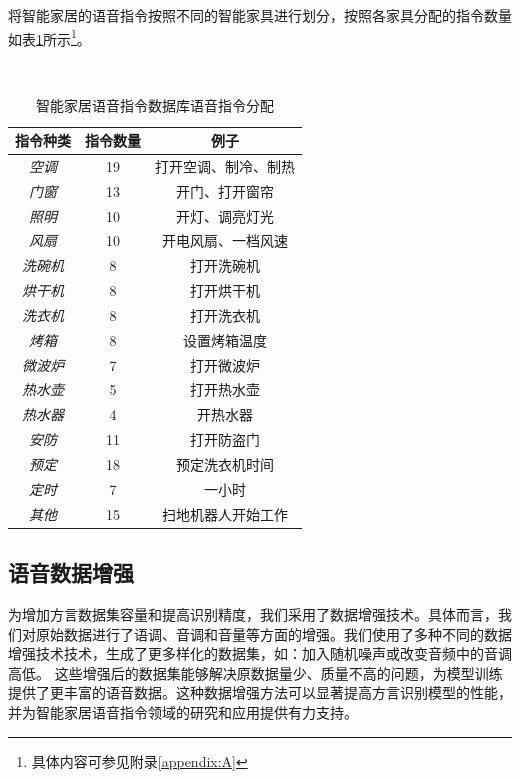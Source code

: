 \documentclass[lang=cn,cite=super]{elegantpaper}
\begin{document}
将智能家居的语音指令按照不同的智能家具进行划分，按照各家具分配的指令数量如表\ref{tab:1}所示\footnote{具体内容可参见附录\ref{appendix:A}}。
\begin{table}[h]
    \caption{\label{tab:1} 智能家居语音指令数据库语音指令分配}\
    \begin{center}
        \begin{tabular}{ccc}
            \toprule
            \textbf{指令种类} & \textbf{指令数量} & \textbf{例子} \\
            \midrule
            \textit{空调} & 19 & 打开空调、制冷、制热 \\
            \textit{门窗} & 13 & 开门、打开窗帘 \\
            \textit{照明} & 10 & 开灯、调亮灯光 \\
            \textit{风扇} & 10 & 开电风扇、一档风速 \\
            \textit{洗碗机} & 8 & 打开洗碗机 \\
            \textit{烘干机} & 8 & 打开烘干机 \\
            \textit{洗衣机} & 8 & 打开洗衣机 \\
            \textit{烤箱} & 8 & 设置烤箱温度 \\
            \textit{微波炉} & 7 & 打开微波炉\\
            \textit{热水壶} & 5 & 打开热水壶 \\
            \textit{热水器} & 4 & 开热水器 \\
            \textit{安防} & 11 & 打开防盗门 \\
            \textit{预定} & 18 & 预定洗衣机时间\\
            \textit{定时} & 7 & 一小时 \\
            \textit{其他} & 15 & 扫地机器人开始工作 \\
            \bottomrule
        \end{tabular}
    \end{center}
\end{table}


\subsection{语音数据增强}
为增加方言数据集容量和提高识别精度，我们采用了数据增强技术。具体而言，我们对原始数据进行了语调、音调和音量等方面的增强。我们使用了多种不同的数据增强技术技术，生成了更多样化的数据集，如：加入随机噪声或改变音频中的音调高低。
这些增强后的数据集能够解决原数据量少、质量不高的问题，为模型训练提供了更丰富的语音数据。这种数据增强方法可以显著提高方言识别模型的性能，并为智能家居语音指令领域的研究和应用提供有力支持。
\end{document}
